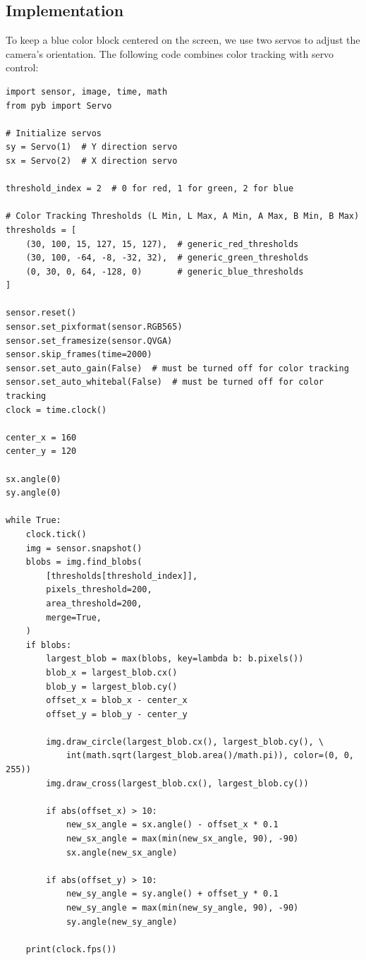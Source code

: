 \documentclass{article}
\begin{document}
\subsection{Implementation}
To keep a blue color block centered on the screen, we use two servos to adjust the camera's orientation. The following code combines color tracking with servo control:
\begin{verbatim}
import sensor, image, time, math
from pyb import Servo

# Initialize servos
sy = Servo(1)  # Y direction servo
sx = Servo(2)  # X direction servo

threshold_index = 2  # 0 for red, 1 for green, 2 for blue

# Color Tracking Thresholds (L Min, L Max, A Min, A Max, B Min, B Max)
thresholds = [
    (30, 100, 15, 127, 15, 127),  # generic_red_thresholds
    (30, 100, -64, -8, -32, 32),  # generic_green_thresholds
    (0, 30, 0, 64, -128, 0)       # generic_blue_thresholds
]

sensor.reset()
sensor.set_pixformat(sensor.RGB565)
sensor.set_framesize(sensor.QVGA)
sensor.skip_frames(time=2000)
sensor.set_auto_gain(False)  # must be turned off for color tracking
sensor.set_auto_whitebal(False)  # must be turned off for color tracking
clock = time.clock()

center_x = 160
center_y = 120

sx.angle(0)
sy.angle(0)

while True:
    clock.tick()
    img = sensor.snapshot()
    blobs = img.find_blobs(
        [thresholds[threshold_index]],
        pixels_threshold=200,
        area_threshold=200,
        merge=True,
    )
    if blobs:
        largest_blob = max(blobs, key=lambda b: b.pixels())
        blob_x = largest_blob.cx()
        blob_y = largest_blob.cy()
        offset_x = blob_x - center_x
        offset_y = blob_y - center_y

        img.draw_circle(largest_blob.cx(), largest_blob.cy(), \
            int(math.sqrt(largest_blob.area()/math.pi)), color=(0, 0, 255))
        img.draw_cross(largest_blob.cx(), largest_blob.cy())

        if abs(offset_x) > 10:
            new_sx_angle = sx.angle() - offset_x * 0.1
            new_sx_angle = max(min(new_sx_angle, 90), -90)
            sx.angle(new_sx_angle)

        if abs(offset_y) > 10:
            new_sy_angle = sy.angle() + offset_y * 0.1
            new_sy_angle = max(min(new_sy_angle, 90), -90)
            sy.angle(new_sy_angle)

    print(clock.fps())
\end{verbatim}
\end{document}
